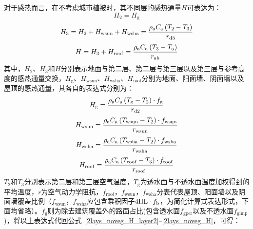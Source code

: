 对于感热而言，在不考虑城市植被时，其不同层的感热通量$H$可表达为：
\begin{equation}\label{2lays_noveg_H_layer2}
  H_{2} = H_{\mathrm{g}}
\end{equation}
%
\begin{equation}\label{2lays_noveg_H_layer3}
  H_{3} = H_{2} + H_{\mathrm{wsun}} + H_{\mathrm{wsha}} = \frac{\rho _{\rm a} C_{\mathrm a} \left( T_{2} - T_{3} \right)}{r_{\mathrm{d3}}}
\end{equation}
%
\begin{equation}\label{2lays_noveg_H}
  H = H_{3} + H_{\mathrm{roof}} = \frac{\rho _{\rm a} C_{\mathrm a} \left( T_{3} - T_{\rm a} \right)}{r_{\mathrm{ah}}}
\end{equation}
其中，$H_2$、$H_3$和$H$分别表示地面与第二层、第二层与第三层以及第三层与参考高度的感热通量交换，$H_{\mathrm{g}}$、$H_{\mathrm{wsun}}$、$H_{\mathrm{wsha}}$、$H_{\mathrm{roof}}$分别为地面、阳面墙、阴面墙以及屋顶的感热通量，其各自的表达式分别为：
\begin{equation}\label{urban_noveg_Hg}
  H_{\mathrm{g}} = \frac{\rho _{\rm a} C_{\mathrm a} \left( T_{\mathrm{g}} - T_{2} \right) \cdot f_{\mathrm{g}}}{r_{\mathrm{d2}}}
\end{equation}
%
\begin{equation}
  H_{\mathrm{wsun}} = \frac{\rho  _{\rm a} C_{\mathrm a} \left( T_{\mathrm{wsun}} - T_{2} \right) \cdot f_{\mathrm{wsun}}}{r_{\mathrm{wsun}}}
\end{equation}
%
\begin{equation}
  H_{\mathrm{wsha}} = \frac{\rho _{\rm a} C_{\mathrm a} \left( T_{\mathrm{wsha}} - T_{2} \right) \cdot f_{\mathrm{wsha}}}{r_{\mathrm{wsha}}}
\end{equation}
%
\begin{equation}\label{urban_noveg_Hroof}
  H_{\mathrm{roof}} = \frac{\rho _{\rm a} C_{\mathrm a} \left( T_{\mathrm{roof}} - T_{3} \right) \cdot f_{\mathrm{roof}}}{r_{\mathrm{roof}}}
\end{equation}
$T_2$和$T_3$分别表示第二层和第三层空气温度，$T_{\mathrm{g}}$为透水面与不透水面温度加权得到的平均温度，$r$为空气动力学阻抗，\allowbreak $f_{\mathrm{roof}}$，\allowbreak  $f_{\mathrm{wsun}}$，\allowbreak  $f_{\mathrm{wsha}}$分表代表屋顶、阳面墙以及阴面墙覆盖比例（$f_{\mathrm{wsun}}，f_{\mathrm{wsha}}$应包含乘积因子$4{\rm HL} \cdot f_{\rm b}$，为简化计算式表达形式，下面均省略）。$f_{\mathrm{g}}$则为除去建筑覆盖外的路面占比(包含透水面$f_{\mathrm{gper}}$以及不透水面$f_{\mathrm{gimp}}$)，将以上表达式代回公式~\eqref{2lays_noveg_H_layer2}--\eqref{2lays_noveg_H}，可得：
